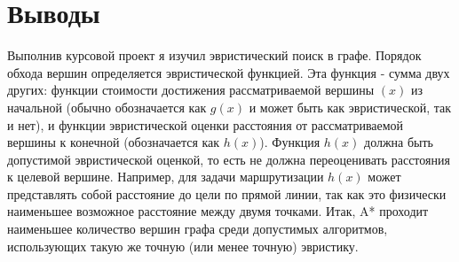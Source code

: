 \section{Выводы}
Выполнив курсовой проект я изучил эвристический поиск в графе. Порядок обхода вершин определяется эвристической функцией. Эта функция - сумма двух других: функции стоимости достижения рассматриваемой вершины $(x)$ из начальной (обычно обозначается как $g(x)$ и может быть как эвристической, так и нет), и функции эвристической оценки расстояния от рассматриваемой вершины к конечной (обозначается как $h(x)$).
Функция $h(x)$ должна быть допустимой эвристической оценкой, то есть не должна переоценивать расстояния к целевой вершине. Например, для задачи маршрутизации $h(x)$ может представлять собой расстояние до цели по прямой линии, так как это физически наименьшее возможное расстояние между двумя точками. Итак, A* проходит наименьшее количество вершин графа среди допустимых алгоритмов, использующих такую же точную (или менее точную) эвристику.
\pagebreak